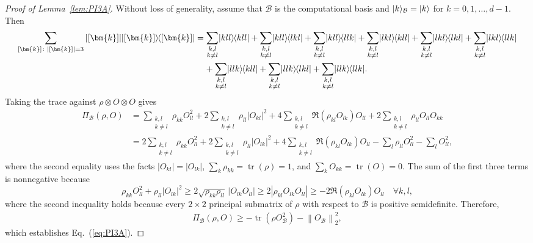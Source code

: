 \documentclass[aps,pra,twocolumn,nofootinbib,superscriptaddress,10pt]{revtex4-2}
\DeclarePairedDelimiter{\ket}{\lvert}{\rangle}
\DeclarePairedDelimiter{\bra}{\langle}{\rvert}
\newcommand{\ketbra}[2]{\ket{#1}\mkern-2mu\bra{#2}}
\newcommand{\proj}[1]{\ketbra{#1}{#1}}
\DeclareMathOperator{\tr}{tr}
\newcommand{\equad}{\,\hphantom{=}\,}   %
\newcommand{\bmk}{\bm{k}}
\newcommand{\caB}{\mathcal{B}}
\newcommand{\eref}[1]{Eq.~\textup{(\ref{#1})}}
\newcommand{\lref}[1]{Lemma~\ref{#1}}
\begin{document}
\begin{proof}[Proof of \lref{lem:PI3A}]
Without loss of generality, assume that $\caB$ is the computational basis and $\ket{k}_\caB=\ket{k}$ for $k=0,1,\ldots, d-1$. Then
\begin{align}
    \sum_{[\bmk]\colon|[\bmk]|=3} |[\bmk]|\proj{[\bmk]} &= \sum_{\substack{k,l \\ k \neq l}}\proj{kll} + \sum_{\substack{k,l \\ k \neq l}}\ketbra{kll}{lkl} + \sum_{\substack{k,l \\ k \neq l}}\ketbra{kll}{llk} + \sum_{\substack{k,l \\ k \neq l}}\ketbra{lkl}{kll} + \sum_{\substack{k,l \\ k \neq l}}\ketbra{lkl}{lkl} + \sum_{\substack{k,l \\ k \neq l}}\ketbra{lkl}{llk}\nonumber\\
    &\equad + \sum_{\substack{k,l \\ k \neq l}}\ketbra{llk}{kll} + \sum_{\substack{k,l \\ k \neq l}}\ketbra{llk}{lkl} + \sum_{\substack{k,l \\ k \neq l}}\ketbra{llk}{llk}.
\end{align}
Taking the trace against $\rho \otimes O \otimes O$ gives
\begin{align}
    \Pi_\caB(\rho, O) &= \sum_{\substack{k,l \\ k \neq l}}\rho_{kk}O_{ll}^2 + 2\sum_{\substack{k,l \\ k \neq l}}\rho_{ll}\left|O_{kl}\right|^2 + 4\sum_{\substack{k,l \\ k \neq l}}\Re\left(\rho_{kl}O_{lk}\right)O_{ll} + 2\sum_{\substack{k,l \\ k \neq l}}\rho_{ll}O_{ll}O_{kk}\nonumber\\
    &= 2\sum_{\substack{k,l \\ k \neq l}}\rho_{kk}O_{ll}^2 + 2\sum_{\substack{k,l \\ k \neq l}}\rho_{ll}\left|O_{lk}\right|^2 + 4\sum_{\substack{k,l \\ k \neq l}}\Re\left(\rho_{kl}O_{lk}\right)O_{ll} - \sum_{l}\rho_{ll}O_{ll}^2 - \sum_l O_{ll}^2, \label{eq:PirhoX0}
\end{align}
where the second equality uses the facts $|O_{kl}|=|O_{lk}|$, $\sum_k\rho_{kk}=\tr(\rho)=1$, and $\sum_k O_{kk}=\tr(O)=0$. The sum of the first three terms is nonnegative because 
\begin{equation}
\rho_{kk}O_{ll}^2 + \rho_{ll}\left|O_{lk}\right|^2 \geq 2\sqrt{\rho_{kk}\rho_{ll}}\,|O_{lk}O_{ll}| \geq 2|\rho_{kl}O_{lk}O_{ll}| \geq -2\Re(\rho_{kl}O_{lk})O_{ll}\quad \forall k,l,
\end{equation}
where the second inequality holds because every $2\times 2$ principal submatrix of $\rho$ with respect to $\caB$ is positive semidefinite. Therefore,
\begin{align}
    \Pi_\caB(\rho, O) \ge -\tr\left(\rho O_\caB^2\right) - \left\|O_\caB\right\|_2^2,
\end{align}
which establishes \eref{eq:PI3A}.
\end{proof}
\end{document}
